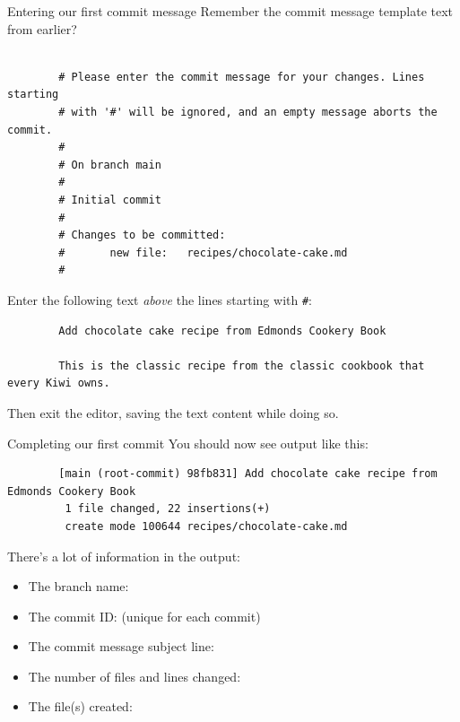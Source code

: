 \documentclass{git_course}
\begin{document}
\begin{frame}[fragile]{Entering our first commit message}
    Remember the commit message template text from earlier?
    \begin{verbatim}

        # Please enter the commit message for your changes. Lines starting
        # with '#' will be ignored, and an empty message aborts the commit.
        #
        # On branch main
        #
        # Initial commit
        #
        # Changes to be committed:
        #       new file:   recipes/chocolate-cake.md
        #
    \end{verbatim}

    Enter the following text \emph{above} the lines starting with \texttt{#}:
    \begin{verbatim}
        Add chocolate cake recipe from Edmonds Cookery Book

        This is the classic recipe from the classic cookbook that every Kiwi owns.
    \end{verbatim}
    Then exit the editor, saving the text content while doing so.
\end{frame}

\begin{frame}[fragile]{Completing our first commit}
    You should now see output like this:
    \begin{verbatim}
        [main (root-commit) 98fb831] Add chocolate cake recipe from Edmonds Cookery Book
         1 file changed, 22 insertions(+)
         create mode 100644 recipes/chocolate-cake.md
    \end{verbatim}

    There's a lot of information in the output:
    \begin{itemize}
        \item The branch name: 
        \item The commit ID:  (unique for each commit)
        \item The commit message subject line:
        \item The number of files and lines changed:
        \item The file(s) created:
    \end{itemize}
\end{frame}
\end{document}
